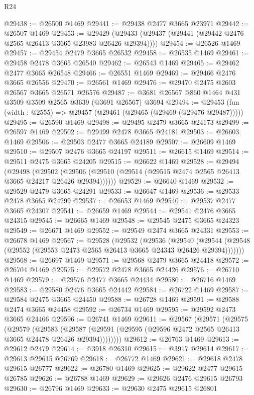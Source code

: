 \begin{lexlean}{R24}
\begin{coremodule}
@29438 := @26500 @1469
@29441 := @29438 @2477 @3665 @23971
@29442 := @26507 @1469
@29453 := @29429 (@29433 (@29437 (@29441 (@29442 @2476 @2565 @26413 @3665 @23983 @26426 @29394))))
@29454 := @26526 @1469
@29457 := @29454 @2479 @3665 @26532
@29458 := @26535 @1469
@29461 := @29458 @2478 @3665 @26540
@29462 := @26543 @1469
@29465 := @29462 @2477 @3665 @26548
@29466 := @26551 @1469
@29469 := @29466 @2476 @3665 @26556
@29470 := @26561 @1469
@29476 := @29470 @2475 @2603 @26567 @3665 @26571 @26576
@29487 := @3681 @26567 @860 @1464 @431 @3509 @3509 @2565 @3639 (@3691 @26567) @3694
@29494 := @29453 (fun (width : @2555) => @29457 (@29461 (@29465 (@29469 (@29476 @29487)))))
@29495 := @26590 @1469
@29498 := @29495 @2479 @3665 @24173
@29499 := @26597 @1469
@29502 := @29499 @2478 @3665 @24181
@29503 := @26603 @1469
@29506 := @29503 @2477 @3665 @24189
@29507 := @26609 @1469
@29510 := @29507 @2476 @3665 @24197
@29511 := @26615 @1469
@29514 := @29511 @2475 @3665 @24205
@29515 := @26622 @1469
@29528 := @29494
    (@29498
      (@29502 (@29506 (@29510 (@29514 (@29515 @2474 @2565 @26413 @3665 @24217 @26426 @29394))))))
@29529 := @26640 @1469
@29532 := @29529 @2479 @3665 @24291
@29533 := @26647 @1469
@29536 := @29533 @2478 @3665 @24299
@29537 := @26653 @1469
@29540 := @29537 @2477 @3665 @24307
@29541 := @26659 @1469
@29544 := @29541 @2476 @3665 @24315
@29545 := @26665 @1469
@29548 := @29545 @2475 @3665 @24323
@29549 := @26671 @1469
@29552 := @29549 @2474 @3665 @24331
@29553 := @26678 @1469
@29567 := @29528
    (@29532
      (@29536
        (@29540 (@29544 (@29548 (@29552 (@29553 @2473 @2565 @26413 @3665 @24343 @26426 @29394)))))))
@29568 := @26697 @1469
@29571 := @29568 @2479 @3665 @24418
@29572 := @26704 @1469
@29575 := @29572 @2478 @3665 @24426
@29576 := @26710 @1469
@29579 := @29576 @2477 @3665 @24434
@29580 := @26716 @1469
@29583 := @29580 @2476 @3665 @24442
@29584 := @26722 @1469
@29587 := @29584 @2475 @3665 @24450
@29588 := @26728 @1469
@29591 := @29588 @2474 @3665 @24458
@29592 := @26734 @1469
@29595 := @29592 @2473 @3665 @24466
@29596 := @26741 @1469
@29611 := @29567
    (@29571
      (@29575
        (@29579
          (@29583
            (@29587 (@29591 (@29595 (@29596 @2472 @2565 @26413 @3665 @24478 @26426 @29394))))))))
@29612 := @26763 @1469
@29613 := @29612 @2479
@29614 := @3918 @26310
@29615 := @3917 @29614
@29617 := @29613 @29615 @26769
@29618 := @26772 @1469
@29621 := @29618 @2478 @29615 @26777
@29622 := @26780 @1469
@29625 := @29622 @2477 @29615 @26785
@29626 := @26788 @1469
@29629 := @29626 @2476 @29615 @26793
@29630 := @26796 @1469
@29633 := @29630 @2475 @29615 @26801

\end{coremodule}
\end{lexlean}
